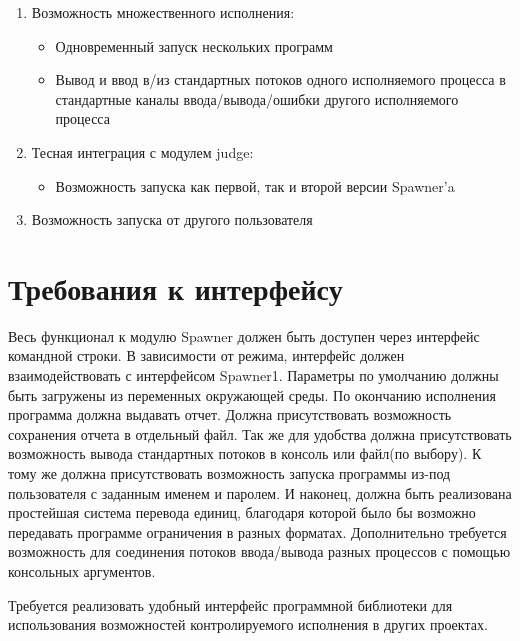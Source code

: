 \documentclass{imcs}
\begin{document}
\begin{enumerate}
\begin{itemize}
        \end{itemize}
    \item Возможность множественного исполнения:
        \begin{itemize}
            \item Одновременный запуск нескольких программ
            \item Вывод и ввод в/из стандартных потоков одного исполняемого процесса в стандартные каналы ввода/вывода/ошибки другого исполняемого процесса
        \end{itemize}
    \item Тесная интеграция с модулем judge:
        \begin{itemize}
            \item Возможность запуска как первой, так и второй версии Spawner'a
        \end{itemize}
    \item Возможность запуска от другого пользователя

\end{enumerate}



\section{Требования к интерфейсу}

Весь функционал к модулю Spawner должен быть доступен через интерфейс командной строки. В зависимости от режима, интерфейс должен взаимодействовать с интерфейсом Spawner1. Параметры по умолчанию должны быть загружены из переменных окружающей среды. По окончанию исполнения программа должна выдавать отчет. Должна присутствовать возможность сохранения отчета в отдельный файл. Так же для удобства должна присутствовать возможность вывода стандартных потоков в консоль или файл(по выбору). К тому же должна присутствовать возможность запуска программы из-под пользователя с заданным именем и паролем. И наконец, должна быть реализована простейшая система перевода единиц, благодаря которой было бы возможно передавать программе ограничения в разных форматах. Дополнительно требуется возможность для соединения потоков ввода/вывода разных процессов с помощью консольных аргументов.

Требуется реализовать удобный интерфейс программной библиотеки для использования возможностей контролируемого исполнения в других проектах.
\end{document}
